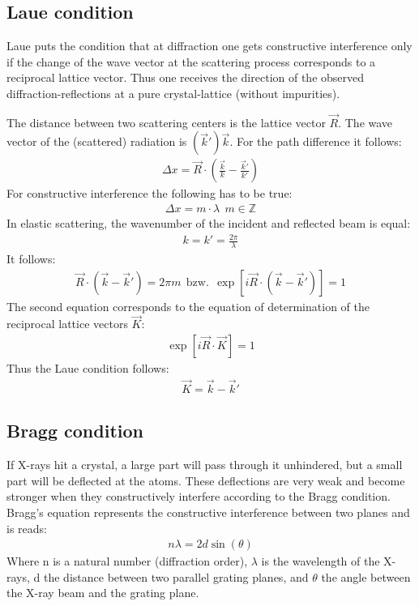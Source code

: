 \subsection{Laue condition}
Laue puts the condition that at diffraction one gets constructive interference only if the change of the wave vector at the scattering process corresponds to a reciprocal lattice vector. Thus one receives the direction of the observed diffraction-reflections at a pure crystal-lattice (without impurities).

The distance between two scattering centers is the lattice vector $\vec{R}$. The wave vector of the (scattered) radiation is $(\vec{k}')\vec{k}$. For the path difference it follows:
\begin{align}
    \Delta x = \vec{R}\cdot\left(\frac{\vec{k}}{k}-\frac{\vec{k}'}{k'}\right)
\end{align}
For constructive interference the following has to be true:
\begin{align}
    \Delta x = m\cdot\lambda\:\:m\in\mathbb{Z}
\end{align}
In elastic scattering, the wavenumber of the incident and reflected beam is equal:
\begin{align}
    k=k'=\frac{2\pi}{\lambda}
\end{align}
It follows:
\begin{align}
    \vec{R}\cdot\left(\vec{k}-\vec{k}'\right)=2\pi m\:\:\text{bzw.}\:\:\exp\left[i\vec{R}\cdot\left(\vec{k}-\vec{k}'\right)\right] = 1
\end{align}
The second equation corresponds to the equation of determination of the reciprocal lattice vectors $\vec{K}$:
\begin{align}
    \exp\left[i\vec{R}\cdot\vec{K}\right]=1
\end{align}
Thus the Laue condition follows:
\begin{align}
    \vec{K}=\vec{k}-\vec{k}'
\end{align}

\subsection{Bragg condition}
If X-rays hit a crystal, a large part will pass through it unhindered, but a small part will be deflected at the atoms. These deflections are very weak and become stronger when they constructively interfere according to the Bragg condition. Bragg's equation represents the constructive interference between two planes and is reads:
\begin{align}
    n\lambda=2d\sin\left(\theta\right)
\end{align}
Where n is a natural number (diffraction order), $\lambda$ is the wavelength of the X-rays, d the distance between two parallel grating planes, and $\theta$ the angle between the X-ray beam
and the grating plane.

